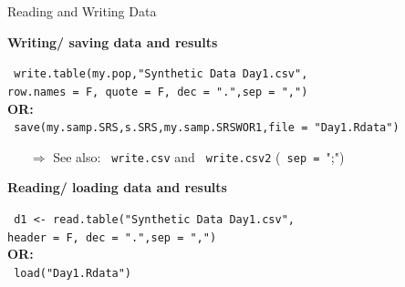 \documentclass[11pt,german,hideothersubsections]{beamer}\usepackage[]{graphicx}\usepackage[]{color}
\newcommand{\R}[1]{{\tt \color{blue}  #1}}
\begin{document}
\begin{frame}[fragile]{Reading and Writing Data}
\footnotesize{
\begin{center}
\textbf{Writing/ saving data and results}\\
\end{center}
\R{write.table(my.pop,"Synthetic Data Day1.csv",\\
            row.names = F, quote = F, dec = ".",sep = ",")}\\ 
            \textbf{OR:}\\
\R{save(my.samp.SRS,s.SRS,my.samp.SRSWOR1,file = "Day1.Rdata")}\\
\begin{itemize}
\item[$\Rightarrow$] See also: \R{write.csv} and \R{write.csv2} (\R{sep = }";")
\end{itemize}
\begin{center}
\textbf{Reading/ loading data and results}\\
\end{center}
\R{d1 <- read.table("Synthetic Data Day1.csv",\\
            header = F, dec = ".",sep = ",")}\\
            \textbf{OR:}\\
\R{load("Day1.Rdata")}}

\end{frame}
\end{document}
